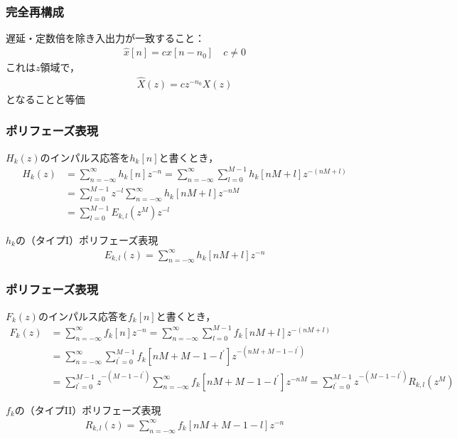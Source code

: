 \documentclass[14pt,xcolor=dvipsnames,table,dvipdfmx]{beamer}
\begin{document}
\begin{frame}[c]
    \frametitle{完全再構成}
    遅延・定数倍を除き入出力が一致すること：
    \begin{align}
        \hat{x}[n] = c x[n - n_{0}] \quad c \neq 0
    \end{align}
    これは$z$領域で，
    \begin{align}
        \hat{X}(z) = c z^{-n_{0}} X(z)
    \end{align}
    となることと等価
\end{frame}

\begin{frame}[c]
    \frametitle{ポリフェーズ表現}
    $H_{k}(z)$のインパルス応答を$h_{k}[n]$と書くとき，
    \small
    \begin{align*}
        H_{k}(z) &= \sum_{n = -\infty}^{\infty} h_{k}[n] z^{-n} = \sum_{n = -\infty}^{\infty} \sum_{l = 0}^{M - 1} h_{k}[nM + l] z^{-(nM+l)} \\
        &= \sum_{l = 0}^{M - 1} z^{-l} \sum_{n = -\infty}^{\infty}h_{k}[nM + l] z^{-nM} \\
        &= \sum_{l = 0}^{M - 1} E_{k,l}(z^{M}) z^{-l}
    \end{align*}
    \normalsize
    \begin{block}{$h_{k}$の（タイプI）ポリフェーズ表現}
        \vspace{-13pt}
        \begin{align}
            E_{k,l}(z) = \sum_{n = -\infty}^{\infty} h_{k}[nM + l] z^{-n} \label{eq:type1_polyphase_representation}
        \end{align}
    \end{block}
\end{frame}

\begin{frame}[c]
    \frametitle{ポリフェーズ表現}
    $F_{k}(z)$のインパルス応答を$f_{k}[n]$と書くとき，
    \scriptsize
    \begin{align*}
        F_{k}(z) &= \sum_{n = -\infty}^{\infty} f_{k}[n] z^{-n} = \sum_{n = -\infty}^{\infty} \sum_{l = 0}^{M - 1} f_{k}[nM + l] z^{-(nM+l)} \\
        &= \sum_{n = -\infty}^{\infty} \sum_{l^{\prime} = 0}^{M - 1} f_{k}[nM + M - 1 - l^{\prime}] z^{-(nM + M - 1 - l^{\prime})} \\
        &= \sum_{l^{\prime} = 0}^{M - 1} z^{-(M - 1 - l^{\prime})} \sum_{n = -\infty}^{\infty} f_{k}[nM + M - 1 - l^{\prime}] z^{-nM} = \sum_{l^{\prime} = 0}^{M - 1} z^{-(M - 1 - l^{\prime})} R_{k,l}(z^{M})
    \end{align*}
    \normalsize
    \begin{block}{$f_{k}$の（タイプII）ポリフェーズ表現}
        \vspace{-13pt}
        \begin{align}
            R_{k,l}(z) = \sum_{n = -\infty}^{\infty} f_{k}[nM + M - 1 - l] z^{-n} \label{eq:type2_polyphase_representation}
        \end{align}
    \end{block}
\end{frame}
\end{document}
